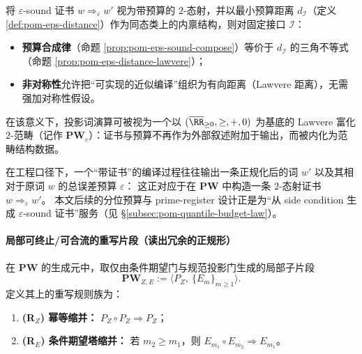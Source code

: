 \begin{remark}\label{rem:pom-pw-eps-lawvere}
将 \(\varepsilon\)-sound 证书 \(w\Longrightarrow_\varepsilon w'\) 视为带预算的 \(2\)-态射，并以最小预算距离 \(d_{\mathcal I}\)（定义 \ref{def:pom-eps-distance}）作为同态类上的内禀结构，则对固定接口 \(\mathcal I\)：
\begin{itemize}
  \item \textbf{预算合成律}（命题 \ref{prop:pom-eps-sound-compose}）等价于 \(d_{\mathcal I}\) 的三角不等式（命题 \ref{prop:pom-eps-distance-lawvere}）；
  \item \textbf{非对称性}允许把“可实现的近似编译”组织为有向距离（Lawvere 距离），无需强加对称性假设。
\end{itemize}
在该意义下，投影词演算可被视为一个以 \((\overline{\RR}_{\ge 0},\ge,+,0)\) 为基底的 Lawvere 富化 \(2\)-范畴（记作 \(\mathbf{PW}_\varepsilon\)）：证书与预算不再作为外部叙述附加于输出，而被内化为范畴结构数据。
\end{remark}

\begin{remark}\label{rem:pom-compile-output-word-eps}
在工程口径下，一个“带证书”的编译过程往往输出一条正规化后的词 \(w'\) 以及其相对于原词 \(w\) 的总误差预算 \(\varepsilon\)：
这正对应于在 \(\mathbf{PW}\) 中构造一条 \(2\)-态射证书 \(w\Longrightarrow_{\varepsilon} w'\)。
本文后续的分位预算与 prime-register 设计正是为“从 side condition 生成 \(\varepsilon\)-sound 证书”服务（见 \S\ref{subsec:pom-quantile-budget-law}）。
\end{remark}

\paragraph{局部可终止/可合流的重写片段（读出冗余的正规形）}
\begin{definition}[读出塔重写系统]\label{def:pom-rewrite-E-tower}
在 $\mathbf{PW}$ 的生成元中，取仅由条件期望门与规范投影门生成的局部子片段
\[
\mathbf{PW}_{Z,E}:=\langle P_Z,\ \{E_m\}_{m\ge 1}\rangle.
\]
定义其上的重写规则族为：
\begin{enumerate}
  \item \textbf{(R$_Z$) 幂等缩并：} $P_Z\circ P_Z\Rightarrow P_Z$；
  \item \textbf{(R$_E$) 条件期望塔缩并：} 若 $m_2\ge m_1$，则 $E_{m_1}\circ E_{m_2}\Rightarrow E_{m_1}$。
\end{enumerate}
\end{definition}

